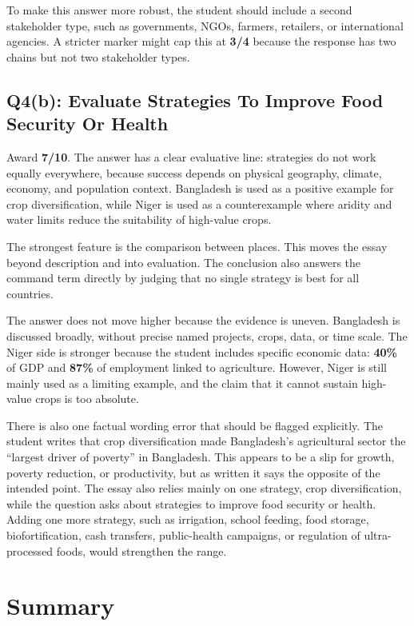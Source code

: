 \documentclass[11pt,a4paper]{article}
\newcommand{\term}[1]{\textcolor{HeadingBlue}{\textbf{#1}}}
\newcommand{\score}[1]{\textcolor{AccentTeal}{\textbf{#1}}}
\begin{document}
To make this answer more robust, the student should include a second
stakeholder type, such as governments, NGOs, farmers, retailers, or
international agencies. A stricter marker might cap this at \score{3/4} because
the response has two chains but not two stakeholder types.

\subsection{Q4(b): Evaluate Strategies To Improve Food Security Or Health}

Award \score{7/10}. The answer has a clear evaluative line: strategies do not
work equally everywhere, because success depends on physical geography,
climate, economy, and population context. Bangladesh is used as a positive
example for crop diversification, while Niger is used as a counterexample where
aridity and water limits reduce the suitability of high-value crops.

The strongest feature is the comparison between places. This moves the essay
beyond description and into evaluation. The conclusion also answers the command
term directly by judging that no single strategy is best for all countries.

The answer does not move higher because the evidence is uneven. Bangladesh is
discussed broadly, without precise named projects, crops, data, or time scale.
The Niger side is stronger because the student includes specific economic data:
\term{40\%} of GDP and \term{87\%} of employment linked to agriculture. However,
Niger is still mainly used as a limiting example, and the claim that it cannot
sustain high-value crops is too absolute.

There is also one factual wording error that should be flagged explicitly. The
student writes that crop diversification made Bangladesh's agricultural sector
the ``largest driver of poverty'' in Bangladesh. This appears to be a slip for
growth, poverty reduction, or productivity, but as written it says the opposite
of the intended point. The essay also relies mainly on one strategy, crop
diversification, while the question asks about strategies to improve food
security or health. Adding one more strategy, such as irrigation, school
feeding, food storage, biofortification, cash transfers, public-health
campaigns, or regulation of ultra-processed foods, would strengthen the range.

\section{Summary}
\end{document}
